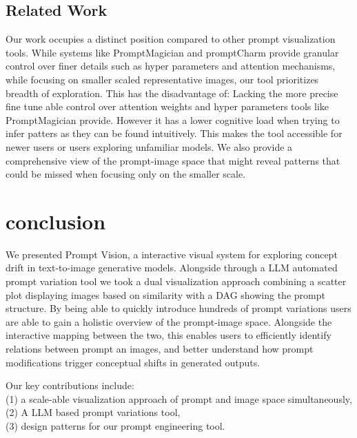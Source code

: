 \documentclass[
  a4paper,  %
  twoside,  %
  bibliography=totoc,
  headsepline,
  cleardoublepage=empty,
  parskip=half,
  draft=false
]{scrbook}
\begin{document}
\section{Related Work}
Our work occupies a distinct position compared to other prompt visualization tools. While systems like PromptMagician and promptCharm \cite{PromptMagician,promptCharm} provide granular control over finer details such as hyper parameters and attention mechanisms, while focusing on smaller scaled representative images, our tool prioritizes breadth of exploration. 
This has the disadvantage of: Lacking the more precise fine tune able control over attention weights and hyper parameters tools like PromptMagician provide. However it has a lower cognitive load when trying to infer patters as they can be found intuitively. This makes the tool accessible for newer users or users exploring unfamiliar models. We also provide a comprehensive view of the prompt-image space that might reveal patterns that could be missed when focusing only on the smaller scale.




















\chapter{conclusion}




We presented Prompt Vision, a interactive visual system for exploring concept drift in text-to-image generative models. Alongside through a LLM automated prompt variation tool we  took a dual visualization approach combining a scatter plot displaying images based on similarity with a DAG showing the prompt structure. By being able to quickly introduce hundreds of prompt variations users are able to gain a holistic overview of the prompt-image space. Alongside the interactive mapping between the two, this enables users to efficiently identify relations between prompt an images, and better understand how prompt modifications trigger conceptual shifts in generated outputs.

Our key contributions include: \\(1) a scale-able visualization approach of prompt and image space simultaneously, \\(2) A LLM based prompt variations tool,\\ (3) design patterns for our prompt engineering tool.
\end{document}
